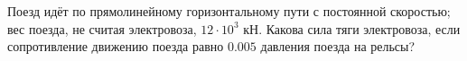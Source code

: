 Поезд идёт по прямолинейному горизонтальному пути с постоянной
скоростью; вес поезда, не считая электровоза, $12\cdot10^3$ кН. Какова сила
тяги электровоза, если сопротивление движению поезда равно $0.005$
давления поезда на рельсы?
